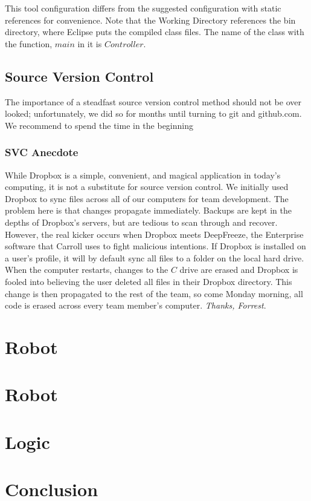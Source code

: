 \documentclass[12pt]{article}
\begin{document}
This tool configuration differs from the suggested configuration with static references for convenience.  Note that the Working Directory references the bin directory, where Eclipse puts the compiled class files.  The name of the class with the function, $main$ in it is $Controller$.

\subsection{Source Version Control}
The importance of a steadfast source version control method should not be over looked; unfortunately, we did so for months until turning to git and github.com.  We recommend to spend the time in the beginning 

\subsubsection*{SVC Anecdote}
While Dropbox is a simple, convenient, and magical application in today's computing, it is not a substitute for source version control.  We initially used Dropbox to sync files across all of our computers for team development.  The problem here is that changes propagate immediately.  Backups are kept in the depths of Dropbox's servers, but are tedious to scan through and recover.  However, the real kicker occurs when Dropbox meets DeepFreeze, the Enterprise software that Carroll uses to fight malicious intentions.  If Dropbox is installed on a user's profile, it will by default sync all files to a folder on the local hard drive.  When the computer restarts, changes to the $C$ drive are erased and Dropbox is fooled into believing the user deleted all files in their Dropbox directory.  This change is then propagated to the rest of the team, so come Monday morning, all code is erased across every team member's computer.  \textit{Thanks, Forrest}.

\clearpage
\section{Robot}

\section{Robot}

\section{Logic}

\section{Conclusion}
\end{document}
